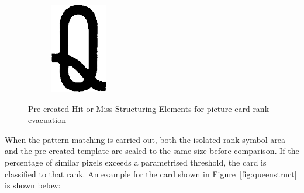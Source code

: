 \documentclass[a4paper,12pt,notitlepage]{article}
\begin{document}
\begin{figure}[H]
\begin{subfigure}[b]{0.14\textwidth}
					\includegraphics[width=\textwidth]{chris/image25}
					\caption{}
				\end{subfigure}
				\caption{Pre-created Hit-or-Miss Structuring Elements for picture card rank evacuation}
				\label{fig:picstruct}
			\end{figure}

			When the pattern matching is carried out, both the isolated rank symbol area and the pre-created template are scaled to the same size before comparison. If the percentage of similar pixels exceeds a parametrised threshold, the card is classified to that rank. An example for the card shown in Figure~\ref{fig:queenstruct} is shown below:
\end{document}
